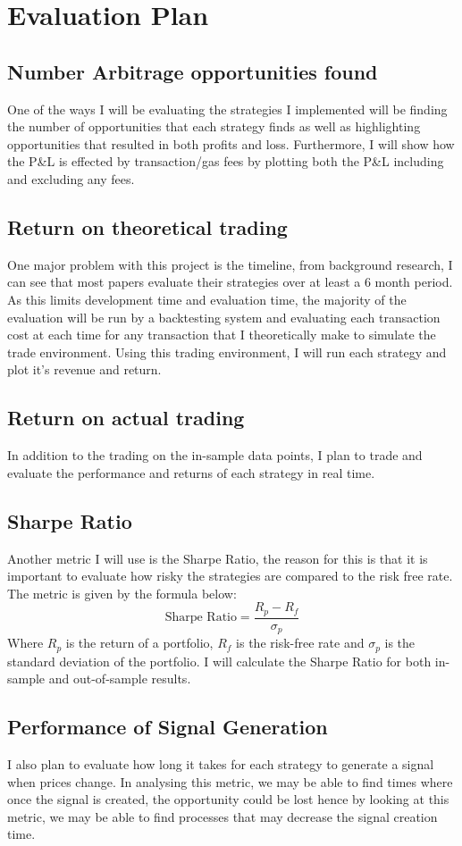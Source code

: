 \chapter{Evaluation Plan}

\section{Number Arbitrage opportunities found}
One of the ways I will be evaluating the strategies I implemented will be finding the number of opportunities that each strategy finds as well as highlighting opportunities that resulted in both profits and loss. Furthermore, I will show how the P\&L is effected by transaction/gas fees by plotting both the P\&L including and excluding any fees.

\section{Return on theoretical trading}
One major problem with this project is the timeline, from background research, I can see that most papers evaluate their strategies over at least a 6 month period. As this limits development time and evaluation time, the majority of the evaluation will be run by a backtesting system and evaluating each transaction cost at each time for any transaction that I theoretically make to simulate the trade environment. Using this trading environment, I will run each strategy and plot it's revenue and return.

\section{Return on actual trading}

In addition to the trading on the in-sample data points, I plan to trade and evaluate the performance and returns of each strategy in real time.

\section{Sharpe Ratio}

Another metric I will use is the Sharpe Ratio, the reason for this is that it is important to evaluate how risky the strategies are compared to the risk free rate. The metric is given by the formula below:$$\text{Sharpe Ratio} = \frac{R_p - R_f}{\sigma_p}$$ Where $R_p$ is the return of a portfolio, $R_f$ is the risk-free rate and $\sigma_p$ is the standard deviation of the portfolio. I will calculate the Sharpe Ratio for both in-sample and out-of-sample results. 

\section{Performance of Signal Generation}

I also plan to evaluate how long it takes for each strategy to generate a signal when prices change. In analysing this metric, we may be able to find times where once the signal is created, the opportunity could be lost hence by looking at this metric, we may be able to find processes that may decrease the signal creation time.

